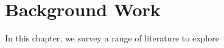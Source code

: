 \chapter{Background Work}
\label{ch:background_work}

In this chapter, we survey a range of literature to explore





